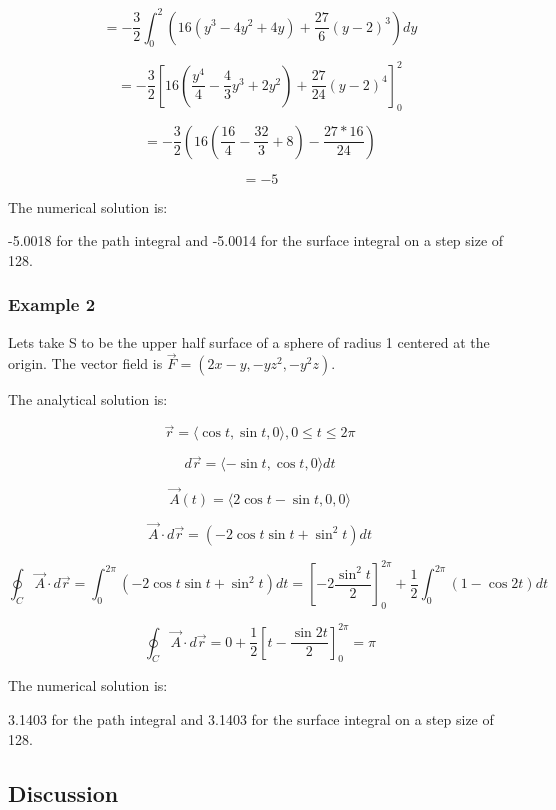 \documentclass[12pt]{article}
\begin{document}
\[
    = - \frac{3}{2} \int_0^2 {\left(16 \left(y^3-4y^2+4y\right) + \frac{27}{6} {\left(y - 2\right)}^3\right) } dy
\]

\[
    = - \frac{3}{2} {\left[16 \left(\frac{y^4}{4}-\frac{4}{3}y^3+2y^2\right) + \frac{27}{24} {\left(y - 2\right)}^4\right] }_0^2
\]

\[
    = - \frac{3}{2} \left(16 \left(\frac{16}{4}-\frac{32}{3}+8\right) - \frac{27*16}{24}\right)
\]

\[
    = - 5
\]

The numerical solution is:

-5.0018 for the path integral and -5.0014 for the surface integral on a step size of 128.

\subsubsection{Example 2}

Lets take S to be the upper half surface of a sphere of radius 1 centered at the origin. The vector field is \(\vec{F} = \left(2x-y, -yz^2, -y^2z\right)\).

The analytical solution is:

\[
    \vec{r}=\langle\cos t, \sin t, 0\rangle, 0 \leq t \leq 2 \pi
\]

\[
    d \vec{r}=\langle-\sin t, \cos t, 0\rangle d t
\]

\[
    \vec{A}(t)=\langle 2 \cos t-\sin t, 0,0\rangle
\]

\[
    \vec{A} \cdot d \vec{r}=\left(-2 \cos t \sin t+\sin ^2 t\right) d t
\]

\[
    \oint_C \vec{A} \cdot d \vec{r}=\int_0^{2 \pi}\left(-2 \cos t \sin t+\sin ^2 t\right) d t=\left[-2 \frac{\sin ^2 t}{2}\right]_0^{2 \pi}+\frac{1}{2} \int_0^{2 \pi}(1-\cos 2 t) d t
\]

\[
    \oint_C \vec{A} \cdot d \vec{r}=0+\frac{1}{2}\left[t-\frac{\sin 2 t}{2}\right]_0^{2 \pi}=\pi
\]

The numerical solution is:

3.1403 for the path integral and 3.1403 for the surface integral on a step size of 128.

\subsection{Discussion}
\end{document}
